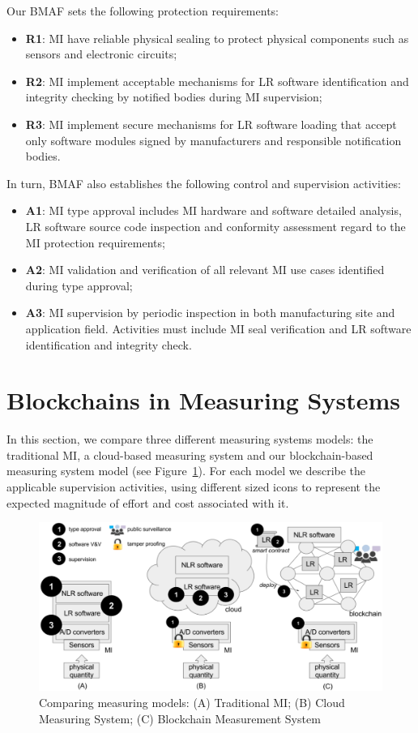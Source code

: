 \documentclass[conference]{IEEEtran}
\begin{document}
Our BMAF sets the following protection requirements:
\begin{itemize}
 \item \textbf{R1}: MI have reliable physical sealing to protect physical components such as sensors and electronic circuits;
 \item \textbf{R2}: MI implement acceptable mechanisms for LR software identification and integrity checking by notified bodies during MI supervision;
 \item \textbf{R3}: MI implement secure mechanisms for LR software loading that accept only software modules signed by manufacturers and responsible notification bodies.
\end{itemize}

In turn, BMAF also establishes the following control and supervision activities:
\begin{itemize}
 \item \textbf{A1}: MI type approval includes MI hardware and software detailed analysis, LR software source code inspection and conformity assessment regard to the MI protection requirements;
 \item \textbf{A2}: MI validation and verification of all relevant MI use cases identified during type approval;
 \item \textbf{A3}: MI supervision by periodic inspection in both manufacturing site and application field. Activities must include MI seal verification and LR software identification and integrity check.
\end{itemize}

\section{Blockchains in Measuring Systems}
In this section, we compare three different measuring systems models: the traditional MI, a cloud-based measuring system and our blockchain-based measuring system model (see Figure~\ref{f:compare}). For each model we describe the applicable supervision activities, using different sized icons to represent the expected magnitude of effort and cost associated with it.

\begin{figure}[!t]
\centering
\includegraphics[width=.64\textwidth]{measuring} %
\caption{Comparing measuring models: (A) Traditional MI; (B) Cloud Measuring System; (C) Blockchain Measurement System}
\label{f:compare}
\end{figure}
\end{document}
